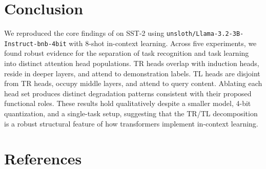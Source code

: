 \documentclass[twoside,english]{article}
\begin{document}
\section{Conclusion} \label{sec:conclusion}

We reproduced the core findings of \cite{TSLA} on SST-2 using \texttt{unsloth/Llama-3.2-3B-Instruct-bnb-4bit} with 8-shot in-context learning. Across five experiments, we found robust evidence for the separation of task recognition and task learning into distinct attention head populations. TR heads overlap with induction heads, reside in deeper layers, and attend to demonstration labels. TL heads are disjoint from TR heads, occupy middle layers, and attend to query content. Ablating each head set produces distinct degradation patterns consistent with their proposed functional roles. These results hold qualitatively despite a smaller model, 4-bit quantization, and a single-task setup, suggesting that the TR/TL decomposition is a robust structural feature of how transformers implement in-context learning.

\section{References} \label{sec:references}
\end{document}

